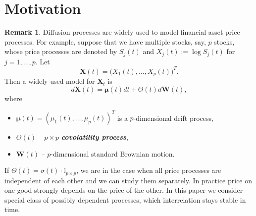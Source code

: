 \documentclass[a4paper,11pt]{article}
\theoremstyle{plain}
\theoremstyle{definition}
\newtheorem{rmrk}[thm]{Remark}
\newcommand{\define}[1]{\textit{\textbf{#1}}}
\begin{document}
	\section*{Motivation}
	\begin{rmrk}
		Diffusion processes are widely used to model financial asset price processes. For example, suppose that we have multiple stocks, say, $p$ stocks, whose price processes are denoted by $S_j(t)$ and $X_j(t) := \log S_j(t)$ for $j = 1, \dots, p$. Let
		\[ \mathbf{X}(t) = \big(X_1(t), \dots, X_p(t)\big)^T. \]
		Then a widely used model for $\mathbf{X}_t$ is
		\begin{equation} \label{X diffeq}
		d\mathbf{X}(t) = \boldsymbol{\mu}(t) dt + \Theta(t) d\mathbf{W}(t),
		\end{equation}
		where 
		\begin{itemize}
			\item $\boldsymbol{\mu}(t) = (\mu_1(t), \dots, \mu_p(t))^T$ is a $p$-dimensional drift process,
			\item $\Theta(t)$ -- $p \times p$ \define{covolatility process},
			\item $\mathbf{W}(t)$ -- $p$-dimensional standard Brownian motion.
		\end{itemize}
		If $\Theta(t) = \sigma(t) \cdot \mathbb{I}_{p \times p} $, we are in the case when all price processes are independent of each other and we can study them separately. In practice price on one good strongly depends on the price of the other. In this paper we consider special class of possibly dependent processes, which interrelation stays stable in time.
	\end{rmrk}
\end{document}
